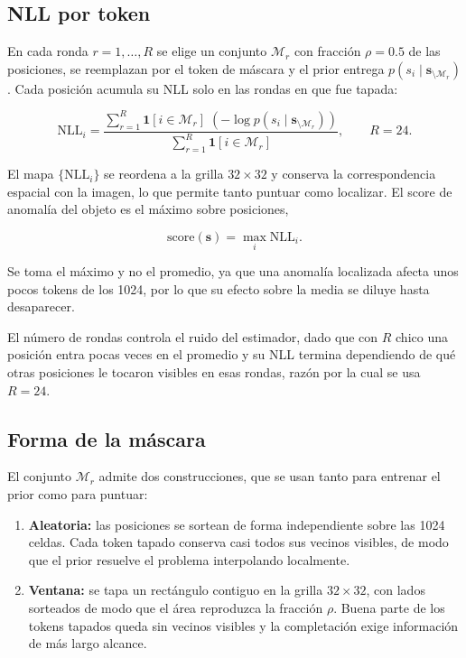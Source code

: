 \subsection{NLL por token}
\label{sec:nll_token}

En cada ronda $r = 1, \ldots, R$ se elige un conjunto $\mathcal{M}_r$ con fracción $\rho = 0.5$ de las posiciones, se reemplazan por el token de máscara y el prior entrega $p(s_i \mid \mathbf{s}_{\setminus \mathcal{M}_r})$. Cada posición acumula su NLL solo en las rondas en que fue tapada:

\begin{equation}
\mathrm{NLL}_i
= \frac{\displaystyle\sum_{r=1}^{R} \mathbf{1}[i\in\mathcal{M}_r]\;
\left(-\log p\!\left(s_i \mid \mathbf{s}_{\setminus \mathcal{M}_r}\right)\right)}
{\displaystyle\sum_{r=1}^{R} \mathbf{1}[i\in\mathcal{M}_r]},
\qquad R = 24.
\label{eq:nll_token}
\end{equation}

El mapa $\{\mathrm{NLL}_i\}$ se reordena a la grilla $32 \times 32$ y conserva la correspondencia espacial con la imagen, lo que permite tanto puntuar como localizar. El score de anomalía del objeto es el máximo sobre posiciones,

\begin{equation}
\mathrm{score}(\mathbf{s}) = \max_i \mathrm{NLL}_i .
\label{eq:score_max}
\end{equation}

Se toma el máximo y no el promedio, ya que una anomalía localizada afecta unos pocos tokens de los 1024, por lo que su efecto sobre la media se diluye hasta desaparecer.

El número de rondas controla el ruido del estimador, dado que con $R$ chico una posición entra pocas veces en el promedio y su NLL termina dependiendo de qué otras posiciones le tocaron visibles en esas rondas, razón por la cual se usa $R = 24$.

\subsection{Forma de la máscara}
\label{sec:forma_mascara}

El conjunto $\mathcal{M}_r$ admite dos construcciones, que se usan tanto para entrenar el prior como para puntuar:

\begin{enumerate}
    \item \textbf{Aleatoria:} las posiciones se sortean de forma independiente sobre las 1024 celdas. Cada token tapado conserva casi todos sus vecinos visibles, de modo que el prior resuelve el problema interpolando localmente.
    \item \textbf{Ventana:} se tapa un rectángulo contiguo en la grilla $32 \times 32$, con lados sorteados de modo que el área reproduzca la fracción $\rho$. Buena parte de los tokens tapados queda sin vecinos visibles y la completación exige información de más largo alcance.
\end{enumerate}

